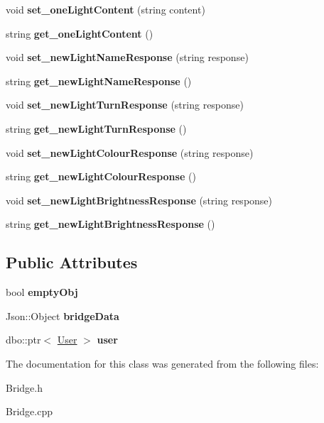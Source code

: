 \begin{DoxyCompactItemize}
void {\bfseries set\+\_\+one\+Light\+Content} (string content)
\item 
\mbox{\label{class_bridge_a7ff075300df5be136b9ae2ca5ecd60a3}} 
string {\bfseries get\+\_\+one\+Light\+Content} ()
\item 
\mbox{\label{class_bridge_ac721f6969c0903fcdf79762adfcd59f6}} 
void {\bfseries set\+\_\+new\+Light\+Name\+Response} (string response)
\item 
\mbox{\label{class_bridge_a6d31c903fa7aa40ae84f615723579782}} 
string {\bfseries get\+\_\+new\+Light\+Name\+Response} ()
\item 
\mbox{\label{class_bridge_a9b55f1e2310798152a1486ceb5b196fc}} 
void {\bfseries set\+\_\+new\+Light\+Turn\+Response} (string response)
\item 
\mbox{\label{class_bridge_ab59c2c1e9e7224d86ba571f5f81400bf}} 
string {\bfseries get\+\_\+new\+Light\+Turn\+Response} ()
\item 
\mbox{\label{class_bridge_a74dc60e7b3dde4fbbb7af15abe1b0298}} 
void {\bfseries set\+\_\+new\+Light\+Colour\+Response} (string response)
\item 
\mbox{\label{class_bridge_a48611c8d3c7c0ffcf039eb8089a56f8a}} 
string {\bfseries get\+\_\+new\+Light\+Colour\+Response} ()
\item 
\mbox{\label{class_bridge_a05222e48ee699274d1340cb811e5977b}} 
void {\bfseries set\+\_\+new\+Light\+Brightness\+Response} (string response)
\item 
\mbox{\label{class_bridge_a6d2acd39d2dd29ce4bf4f44fe0a6827d}} 
string {\bfseries get\+\_\+new\+Light\+Brightness\+Response} ()
\end{DoxyCompactItemize}
\subsection*{Public Attributes}
\begin{DoxyCompactItemize}
\item 
\mbox{\label{class_bridge_a2315fd734cffa681760940878d3a8e28}} 
bool {\bfseries empty\+Obj}
\item 
\mbox{\label{class_bridge_ab3fb62c54a0e927030ff4bed1d9478f5}} 
Json\+::\+Object {\bfseries bridge\+Data}
\item 
\mbox{\label{class_bridge_a7aa11901eca1f0af1901a12c81a0b39f}} 
dbo\+::ptr$<$ \hyperlink{class_user}{User} $>$ {\bfseries user}
\end{DoxyCompactItemize}


The documentation for this class was generated from the following files\+:\begin{DoxyCompactItemize}
\item 
Bridge.\+h\item 
Bridge.\+cpp\end{DoxyCompactItemize}
